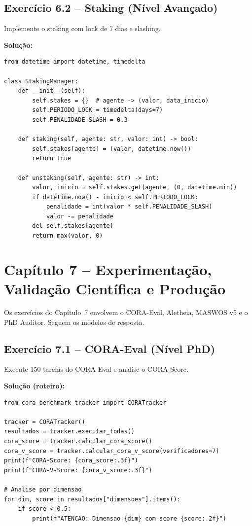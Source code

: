 \subsection*{Exercício 6.2 -- Staking (Nível Avançado)}
Implemente o staking com lock de 7 dias e slashing.

\textbf{Solução:}
\begin{lstlisting}[style=pythonstyle]
from datetime import datetime, timedelta

class StakingManager:
    def __init__(self):
        self.stakes = {}  # agente -> (valor, data_inicio)
        self.PERIODO_LOCK = timedelta(days=7)
        self.PENALIDADE_SLASH = 0.3

    def staking(self, agente: str, valor: int) -> bool:
        self.stakes[agente] = (valor, datetime.now())
        return True

    def unstaking(self, agente: str) -> int:
        valor, inicio = self.stakes.get(agente, (0, datetime.min))
        if datetime.now() - inicio < self.PERIODO_LOCK:
            penalidade = int(valor * self.PENALIDADE_SLASH)
            valor -= penalidade
        del self.stakes[agente]
        return max(valor, 0)
\end{lstlisting}

\section*{Capítulo 7 -- Experimentação, Validação Científica e Produção}

Os exercícios do Capítulo~7 envolvem o CORA-Eval, Aletheia, MASWOS v5
e o PhD Auditor. Seguem os modelos de resposta.

\subsection*{Exercício 7.1 -- CORA-Eval (Nível PhD)}
Execute 150 tarefas do CORA-Eval e analise o CORA-Score.

\textbf{Solução (roteiro):}
\begin{lstlisting}[style=pythonstyle]
from cora_benchmark_tracker import CORATracker

tracker = CORATracker()
resultados = tracker.executar_todas()
cora_score = tracker.calcular_cora_score()
cora_v_score = tracker.calcular_cora_v_score(verificadores=7)
print(f"CORA-Score: {cora_score:.3f}")
print(f"CORA-V-Score: {cora_v_score:.3f}")

# Analise por dimensao
for dim, score in resultados["dimensoes"].items():
    if score < 0.5:
        print(f"ATENCAO: Dimensao {dim} com score {score:.2f}")
\end{lstlisting}


